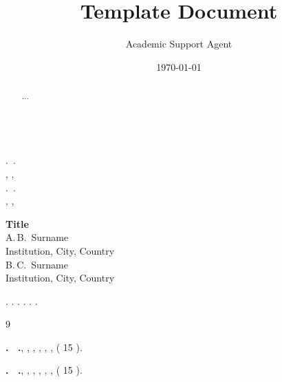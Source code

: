 \documentclass{article}
\title{Template Document}
\author{Academic Support Agent}
\date{\today}
\begin{document}
\maketitle

\renewcommand\refname{\centering \textit{\small{ }}}

\begin{center}
{\large\bf    } \\[5mm]  .\, .~  \\
  ,  ,   \\
  .\, .~ \\  ,   ,  
\end{center}
\begin{abstract}
   ...
\end{abstract}

\begin{center}
{\large\bf  Title}  \\ A.\,B.~Surname \\
 Institution, City, Country \\
 B.\,C.~Surname\\ Institution,  City, Country 
\end{center}

   .    .    .    .    .     \cite{Paper1}.

\begin{thebibliography}{9}
     
\end{thebibliography}

\begin{center}
\textit{\large      }
\end{center}

\textbf{   .~ .},    ,    ,  ,    ,    ,       (  15  ).

\textbf{   .~ .},    ,    ,  ,    ,    ,       (  15  ).
\end{document}
